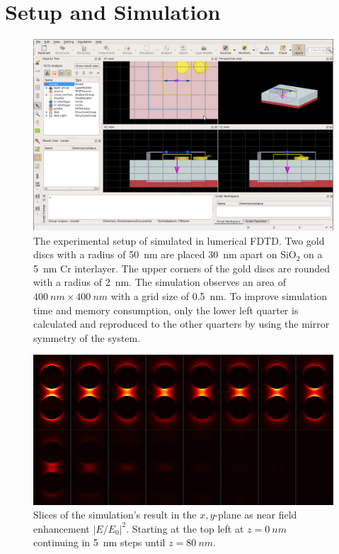 \newpage
\section{Setup and Simulation}
\begin{figure}[!h]
  \includegraphics[width=\textwidth]{./images/lumerical.png}
  \caption{The experimental setup of \cite{heeg} simulated in lumerical FDTD. Two gold discs with a radius of \SI{50}{nm} are placed \SI{30}{nm} apart on SiO$_2$ on a \SI{5}{nm} Cr interlayer. The upper corners of the gold discs are rounded with a radius of \SI{2}{nm}. The simulation observes an area of $\SI{400}{nm}\times\SI{400}{nm}$ with a grid size of \SI{0.5}{nm}. To improve simulation time and memory consumption, only the lower left quarter is calculated and reproduced to the other quarters by using the mirror symmetry of the system.}
\end{figure}

\begin{figure}[!h]
  \includegraphics[width=\textwidth]{./images/simulation-slices.png}
  \caption{Slices of the simulation's result in the $x,y$-plane as near field enhancement $|E/E_0|^2$. Starting at the top left at $z=\SI{0}{nm}$ continuing in \SI{5}{nm} steps until $z=\SI{80}{nm}$.}
\end{figure}

